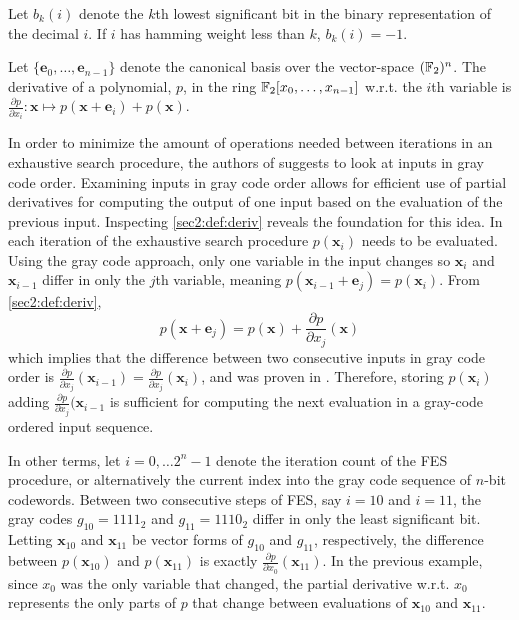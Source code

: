 \begin{defn}[] \label{sec2:def:bk}
    Let $b_k(i)$ denote the $k$th lowest significant bit in the binary representation of the decimal $i$. If $i$ has hamming weight less than $k$, $b_k(i) = -1$.
\end{defn}

\begin{defn}[Derivatives] \label{sec2:def:deriv}
    Let $\{\mathbf{e}_0, \dots, \mathbf{e}_{n-1}\}$ denote the canonical basis over the vector-space $(\mathbb{F}_2)^n$. The derivative of a polynomial, $p$, in the ring $\mathbb{F}_2[x_0,\dots,x_{n-1}]$ w.r.t. the $i$th variable is $\frac{\partial p}{\partial x_i} : \mathbf{x} \mapsto p(\mathbf{x} + \mathbf{e}_i) + p(\mathbf{x})$.
\end{defn}

In order to minimize the amount of operations needed between iterations in an exhaustive search procedure, the authors of \cite{cryptoeprint:2010/313} suggests to look at inputs in gray code order. Examining inputs in gray code order allows for efficient use of partial derivatives for computing the output of one input based on the evaluation of the previous input. Inspecting \cref{sec2:def:deriv} reveals the foundation for this idea. In each iteration of the exhaustive search procedure $p(\mathbf{x}_i)$ needs to be evaluated. Using the gray code approach, only one variable in the input changes so $\mathbf{x}_i$ and $\mathbf{x}_{i - 1}$ differ in only the $j$th variable, meaning $p(\mathbf{x}_{i - 1} + \mathbf{e}_j) = p(\mathbf{x}_i)$. From \cref{sec2:def:deriv}, $$
    p(\mathbf{x} + \mathbf{e}_j) = p(\mathbf{x}) + \frac{\partial p}{\partial x_j}(\mathbf{x})
$$ 
which implies that the difference between two consecutive inputs in gray code order is $\frac{\partial p}{\partial x_j}(\mathbf{x}_{i - 1}) = \frac{\partial p}{\partial x_j}(\mathbf{x}_i)$, and was proven in \cite{tungchoumasters}. Therefore, storing $p(\mathbf{x}_i)$ adding $\frac{\partial p}{\partial x_j}(\mathbf{x}_{i-1}$ is sufficient for computing the next evaluation in a gray-code ordered input sequence.

In other terms, let $i = 0,\dots 2^n-1$ denote the iteration count of the FES procedure, or alternatively the current index into the gray code sequence of $n$-bit codewords. Between two consecutive steps of FES, say $i = 10$ and $i = 11$, the gray codes $g_{10} = 1111_2$ and $g_{11} = 1110_2$ differ in only the least significant bit. Letting $\mathbf{x}_{10}$ and $\mathbf{x}_{11}$ be vector forms of $g_{10}$ and $g_{11}$, respectively, the difference between $p(\mathbf{x}_{10})$ and $p(\mathbf{x}_{11})$ is exactly $\frac{\partial p}{\partial x_0}(\mathbf{x}_{11})$. In the previous example, since $x_0$ was the only variable that changed, the partial derivative w.r.t. $x_0$ represents the only parts of $p$ that change between evaluations of $\mathbf{x}_{10}$ and $\mathbf{x}_{11}$.

